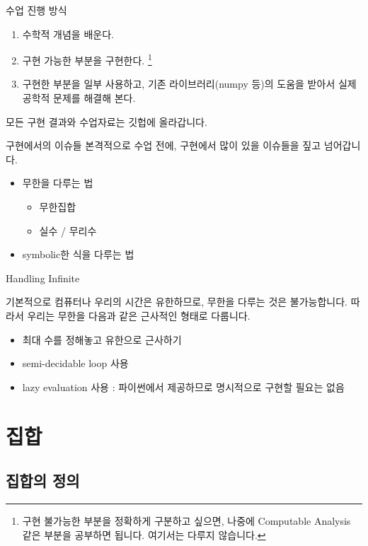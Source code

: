 \documentclass{beamer}
\begin{document}
\begin{frame}{수업 진행 방식}
\begin{enumerate} 
\item 수학적 개념을 배운다. 
\item 구현 가능한 부분을 구현한다. \footnote{구현 불가능한 부분을 정확하게 구분하고 싶으면, 나중에 Computable Analysis 같은 부분을 공부하면 됩니다. 여기서는 다루지 않습니다. }
\item 구현한 부분을 일부 사용하고, 기존 라이브러리(numpy 등)의 도움을 받아서 실제 공학적 문제를 해결해 본다. 
\end{enumerate}

모든 구현 결과와 수업자료는 깃헙에 올라갑니다. 
\end{frame}

\begin{frame}{구현에서의 이슈들}
본격적으로 수업 전에, 구현에서 많이 있을 이슈들을 짚고 넘어갑니다. 
\begin{itemize}
\item 무한을 다루는 법 
\begin{itemize} 
\item 무한집합 
\item 실수 / 무리수 
\end{itemize}
\item symbolic한 식을 다루는 법 
\end{itemize}
\end{frame}

\begin{frame}{Handling Infinite} 

기본적으로 컴퓨터나 우리의 시간은 유한하므로, 무한을 다루는 것은 불가능합니다. 따라서 우리는 무한을 다음과 같은 근사적인 형태로 다룹니다. 

\begin{itemize}
\item 최대 수를 정해놓고 유한으로 근사하기 
\item semi-decidable loop 사용 
\item lazy evaluation 사용 : 파이썬에서 제공하므로 명시적으로 구현할 필요는 없음
\end{itemize}

\end{frame}

\section{집합} 

\subsection{집합의 정의} 
\end{document}
